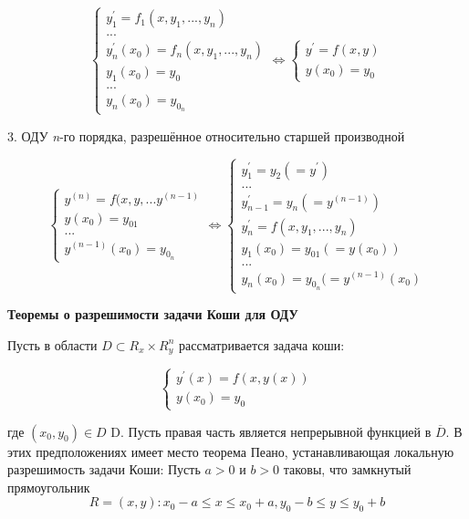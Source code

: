 \documentclass[11pt, a4paper]{article}
\begin{document}
$$\begin{cases}y^{'}_{1} = f_{1}(x,y_{1},...,y_{n})\\     ... \\y^{'}_n(x_{0})=f_{n}(x,y_{1},...,y_{n})\\y_{1}(x_{0})=y_{0}\\...\\y_{n}(x_{0})=y_{0_{n}}\end{cases}\Leftrightarrow\begin{cases}y^{'} = f(x,y)\\y(x_{0})=y_{0}\end{cases}$$

  3. ОДУ \textit{n}-го порядка, разрешённое относительно старшей производной

$$\begin{cases}y^{(n)} = f(x,y,...y^{(n-1)}\\y(x_{0})=y_{01}\\...\\y^{(n-1)}(x_{0})=y_{0_{n}}\end{cases}\Leftrightarrow\begin{cases}y^{'}_{1}=y_{2} (=y^{'})\\...\\y^{'}_{n-1}=y_{n} (=y^{(n-1)})\\y^{'}_{n}=f(x,y_{1},...,y_{n})\\y_{1}(x_{0})=y_{01}(=y(x_{0}))\\...\\y_{n}(x_{0})=y_{0_{n}}(=y^{(n-1)}(x_{0})\end{cases}$$

 \begin{center}
    \textbf{Теоремы о разрешимости задачи Коши для ОДУ}
  \end{center}
  
Пусть в области $ D\subset R_{x} \times R^{n}_{y} $ рассматривается задача коши:

$$\begin{cases}y^{'}(x) = f(x,y(x))\\y(x_{0})=y_{0}\end{cases}$$	

где $ (x_{0},y_{0})\in D $ D. Пусть правая часть является непрерывной функцией в $ \overline{D} $. В этих предположениях имеет место теорема Пеано, устанавливающая локальную разрешимость задачи Коши: Пусть $ a>0 $ и $ b>0 $ таковы, что замкнутый прямоугольник
$$R={(x,y):x_{0}-a\leq x\leq x_{0}+a, y_{0}-b\leq y\leq y_{0}+b}$$
\end{document}
